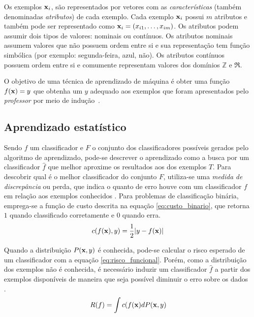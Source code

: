 Os exemplos $\mathbf{x}_i$, são representados por vetores com as \emph{características} (também denominadas \emph{atributos}) de cada exemplo. Cada exemplo $\mathbf{x}_i$ possui $m$ atributos e também pode ser representado como $\mathbf{x}_i = (x_{i1},\dotsc,x_{im})$. Os atributos podem assumir dois tipos de valores: nominais ou contínuos. Os atributos nominais assumem valores que não possuem ordem entre si e sua representação tem função simbólica (por exemplo: segunda-feira, azul, não). Os atributos contínuos possuem ordem entre si e comumente representam valores dos domínios $\mathbb{Z}$ e $\Re$.

O objetivo de uma técnica de aprendizado de máquina é obter uma função $f(\mathbf{x}) = y$ que obtenha um $y$ adequado aos exemplos que foram apresentados pelo \emph{professor} por meio de indução~\cite{osuna1997support}.


\subsection{Aprendizado estatístico}\label{sec:aprendizado}

Sendo $f$ um classificador e $F$ o conjunto dos classificadores possíveis gerados pelo algoritmo de aprendizado, pode-se descrever o aprendizado como a busca por um classificador $\hat{f}$ que melhor aproxime os resultados aos dos exemplos $T$. Para descobrir qual é o melhor classificador do conjunto $F$, utiliza-se uma \emph{medida de discrepância} ou perda, que indica o quanto de erro houve com um classificador $f$ em relação aos exemplos conhecidos \cite{vapnik1998statistical}. Para problemas de classificação binária, emprega-se a função de custo descrita na equação \ref{eq:custo_binario}, que retorna $1$ quando classificado corretamente e $0$ quando erra.
\begin{equation}\label{eq:custo_binario}
  c(f(\mathbf{x}), y) = \frac{1}{2} | y - f(\mathbf{x})|
\end{equation}

Quando a distribuição $P(\mathbf{x},y)$ é conhecida, pode-se calcular o risco esperado de um classificador com a equação \ref{eq:risco_funcional}. Porém, como a distribuição dos exemplos não é conhecida, é necessário induzir um classificador $\hat{f}$ a partir dos exemplos disponíveis de maneira que seja possível diminuir o erro sobre os dados \cite{scholkopf2002learning}. 
\begin{equation}\label{eq:risco_funcional}
  R(f) = \int{ c(f(\mathbf{x})dP(\mathbf{x}, y) }
\end{equation}


